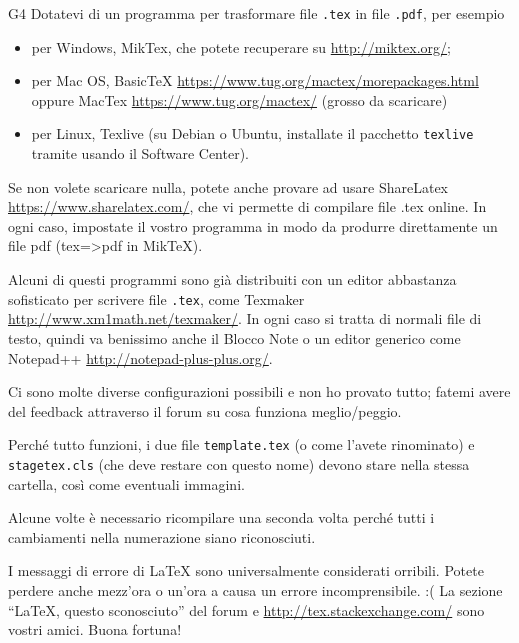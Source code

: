 \documentclass{stagetex}
\begin{document}
\begin{soluzione}{G4}
Dotatevi di un programma per trasformare file \texttt{.tex} in file \texttt{.pdf}, per esempio
 \begin{itemize}
  \item per Windows, MikTex, che potete recuperare su \url{http://miktex.org/};
  \item per Mac OS, BasicTeX \url{https://www.tug.org/mactex/morepackages.html} oppure MacTex \url{https://www.tug.org/mactex/} (grosso da scaricare)
  \item per Linux, Texlive (su Debian o Ubuntu, installate il pacchetto \texttt{texlive} tramite usando il Software Center).
 \end{itemize}
Se non volete scaricare nulla, potete anche provare ad usare ShareLatex \url{https://www.sharelatex.com/}, che vi permette di compilare file .tex online.
In ogni caso, impostate il vostro programma in modo da produrre direttamente un file pdf (tex=>pdf in MikTeX).

Alcuni di questi programmi sono già distribuiti con un editor abbastanza sofisticato per scrivere file \texttt{.tex}, come Texmaker \url{http://www.xm1math.net/texmaker/}.
In ogni caso si tratta di normali file di testo, quindi va benissimo anche il Blocco Note o un editor generico come Notepad++ \url{http://notepad-plus-plus.org/}.

Ci sono molte diverse configurazioni possibili e non ho provato tutto; fatemi avere del feedback attraverso il forum su cosa funziona meglio/peggio.

Perché tutto funzioni, i due file \texttt{template.tex} (o come l'avete rinominato) e \texttt{stagetex.cls} (che deve restare con questo nome)
devono stare nella stessa cartella, così come eventuali immagini.

Alcune volte è necessario ricompilare una seconda volta perché tutti i cambiamenti nella numerazione siano riconosciuti.

I messaggi di errore di \LaTeX{} sono universalmente considerati orribili. Potete perdere anche mezz'ora o un'ora a causa un errore incomprensibile. :(
La sezione ``LaTeX, questo sconosciuto'' del forum e \url{http://tex.stackexchange.com/} sono vostri amici. Buona fortuna!
\end{soluzione}
\end{document}
